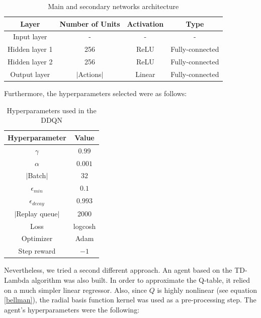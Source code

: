 \documentclass[11pt,twoside]{article}
\begin{document}
\begin{table}[H]
	\begin{center}
		\begin{tabular}{|c|c|c|c|} 
			\hline
			Layer & Number of Units & Activation & Type \\
			\hline\hline
			Input layer & - & - & - \\ 
			\hline
			Hidden layer 1 & 256 & ReLU & Fully-connected\\
			\hline
			Hidden layer 2 & 256 & ReLU & Fully-connected\\
			\hline
			Output layer & $|$Actions$|$ & Linear & Fully-connected\\
			\hline
		\end{tabular}
		\caption{Main and secondary networks architecture}
	\end{center}
\end{table}

Furthermore, the hyperparameters selected were as follows:

\begin{table}[H]
	\begin{center}
		\begin{tabular}{|c |c|} 
			\hline
			Hyperparameter & Value \\
			\hline\hline
			$\gamma$ & $0.99$ \\
			$\alpha$ & $0.001$ \\
			$|$Batch$|$ & $32$ \\
			$\epsilon_{min}$ & $0.1$ \\
			$\epsilon_{decay}$ & $0.993$ \\
			$|$Replay queue$|$ & 2000 \\
			Loss & logcosh \\
			Optimizer & Adam \\
			Step reward & $-1$ \\
			\hline
		\end{tabular}
		\caption{Hyperparameters used in the DDQN}
	\end{center}
\end{table}

Nevertheless, we tried a second different approach. An agent based on the TD-Lambda algorithm was also built. In order to approximate the Q-table, it relied on a much simpler linear regressor. Also, since $Q$ is highly nonlinear (see equation \ref{bellman}), the radial basis function kernel was used as a pre-processing step. The agent's hyperparameters were the following:
\end{document}
